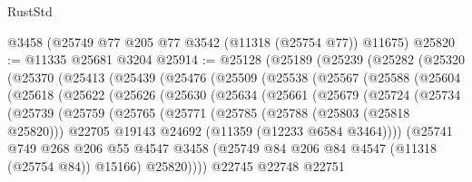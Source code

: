\begin{lexlean}{RustStd}
\begin{coremodule}
{{{{{{{{{{{{{{{{{{{    @3458
    (@25749 @77 @205 @77 @3542 (@11318 (@25754 @77)) @11675)
@25820 := @11335 @25681 @3204
@25914 := @25128
    (@25189
      (@25239
        (@25282
          (@25320
            (@25370
              (@25413
                (@25439
                  (@25476
                    (@25509
                      (@25538
                        (@25567
                          (@25588
                            (@25604
                              (@25618
                                (@25622
                                  (@25626
                                    (@25630
                                      (@25634
                                        (@25661
                                          (@25679
                                            (@25724
                                              (@25734
                                                (@25739
                                                  (@25759
                                                    (@25765
                                                      (@25771
                                                        (@25785
                                                          (@25788 (@25803 (@25818 @25820)))
                                                          @22705
                                                          @19143
                                                          @24692
                                                          (@11359 (@12233 @6584 @3464))))
                                                      (@25741
                                                        @749
                                                        @268
                                                        @206
                                                        @55
                                                        @4547
                                                        @3458
                                                        (@25749
                                                          @84
                                                          @206
                                                          @84
                                                          @4547
                                                          (@11318 (@25754 @84))
                                                          @15166)
                                                        @25820))))
                                                @22745
                                                @22748
                                                @22751
}}}}}}}}}}}}}}}}}}}
\end{coremodule}
\end{lexlean}
